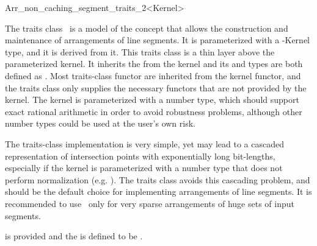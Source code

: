 
\ccRefPageBegin

\begin{ccRefClass}{Arr_non_caching_segment_traits_2<Kernel>}
    
\ccDefinition 

The traits class \ccRefName\ is a model of the 
concept that allows the construction and maintenance of arrangements of
line segments. It is parameterized with a \cgal-Kernel type, and it
is derived from it. This traits class is a thin layer above the
parameterized kernel. It inherits the  from the kernel and its
 and  types are both defined as
. Most traits-class functor are inherited from the
kernel functor, and the traits class only supplies the necessary functors
that are not provided by the kernel. The kernel is parameterized with a
number type, which should support exact rational arithmetic in order to
avoid robustness problems, although other number types could be used at the
user's own risk.

The traits-class implementation is very simple, yet may lead to
a cascaded representation of intersection points with exponentially long
bit-lengths, especially if the kernel is parameterized with a number type
that does not perform normalization (e.g. ).
The  traits class avoids this cascading
problem, and should be the default choice for implementing arrangements of
line segments. It is recommended to use \ccRefName\ only for very sparse
arrangements of huge sets of input segments.

 is provided and the 
is defined to be .
    
 
\ccIsModel
     \\
     \\

\ccInheritsFrom

\ccSeeAlso

\end{ccRefClass}
\ccRefPageEnd
